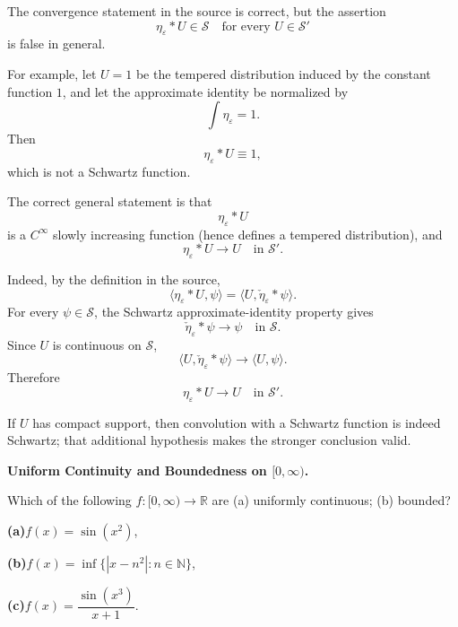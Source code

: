 \begin{solution}
The convergence statement in the source is correct, but the assertion
\[
\eta_\varepsilon*U\in\mathcal S
\quad\text{for every }U\in\mathcal S'
\]
is false in general.

For example, let \(U=1\) be the tempered distribution induced by the constant function \(1\),
and let the approximate identity be normalized by
\[
\int\eta_\varepsilon=1.
\]
Then
\[
\eta_\varepsilon*U\equiv1,
\]
which is not a Schwartz function.

The correct general statement is that
\[
\eta_\varepsilon*U
\]
is a \(C^\infty\) slowly increasing function (hence defines a tempered distribution), and
\[
\eta_\varepsilon*U\longrightarrow U
\quad\text{in }\mathcal S'.
\]

Indeed, by the definition in the source,
\[
\langle\eta_\varepsilon*U,\psi\rangle
=
\langle U,\check\eta_\varepsilon*\psi\rangle.
\]
For every \(\psi\in\mathcal S\), the Schwartz approximate-identity property gives
\[
\check\eta_\varepsilon*\psi
\longrightarrow
\psi
\quad\text{in }\mathcal S.
\]
Since \(U\) is continuous on \(\mathcal S\),
\[
\langle U,\check\eta_\varepsilon*\psi\rangle
\longrightarrow
\langle U,\psi\rangle.
\]
Therefore
\[
\boxed{
\eta_\varepsilon*U\to U
\quad\text{in }\mathcal S'.
}
\]

If \(U\) has compact support, then convolution with a Schwartz function is indeed Schwartz;
that additional hypothesis makes the stronger conclusion valid.
\end{solution}


\begin{problem}[CP-II-0206]
\label{prob:cp-ii-0206}
\textbf{Uniform Continuity and Boundedness on $[0,\infty)$.}

\hspace*{1.5em}Which of the following $f:[0,\infty)\to\mathbb R$ are (a) uniformly continuous; (b) bounded?

	\par\smallskip\noindent\textbf{(a)}\quad $f(x)=\sin(x^2)$,
	\par\smallskip\noindent\textbf{(b)}\quad $f(x)=\inf\{|x-n^2|:n\in\mathbb N\}$,
	\par\smallskip\noindent\textbf{(c)}\quad $f(x)=\dfrac{\sin(x^3)}{x+1}$.
\end{problem}

